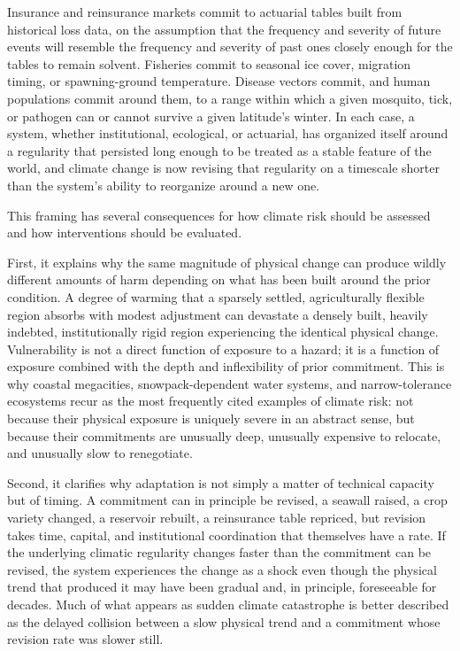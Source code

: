 \documentclass[11pt,oneside]{book}
\begin{document}
Insurance and reinsurance markets commit to actuarial tables built from historical loss data, on the assumption that the frequency and severity of future events will resemble the frequency and severity of past ones closely enough for the tables to remain solvent. Fisheries commit to seasonal ice cover, migration timing, or spawning-ground temperature. Disease vectors commit, and human populations commit around them, to a range within which a given mosquito, tick, or pathogen can or cannot survive a given latitude's winter. In each case, a system, whether institutional, ecological, or actuarial, has organized itself around a regularity that persisted long enough to be treated as a stable feature of the world, and climate change is now revising that regularity on a timescale shorter than the system's ability to reorganize around a new one.

This framing has several consequences for how climate risk should be assessed and how interventions should be evaluated.

First, it explains why the same magnitude of physical change can produce wildly different amounts of harm depending on what has been built around the prior condition. A degree of warming that a sparsely settled, agriculturally flexible region absorbs with modest adjustment can devastate a densely built, heavily indebted, institutionally rigid region experiencing the identical physical change. Vulnerability is not a direct function of exposure to a hazard; it is a function of exposure combined with the depth and inflexibility of prior commitment. This is why coastal megacities, snowpack-dependent water systems, and narrow-tolerance ecosystems recur as the most frequently cited examples of climate risk: not because their physical exposure is uniquely severe in an abstract sense, but because their commitments are unusually deep, unusually expensive to relocate, and unusually slow to renegotiate.

Second, it clarifies why adaptation is not simply a matter of technical capacity but of timing. A commitment can in principle be revised, a seawall raised, a crop variety changed, a reservoir rebuilt, a reinsurance table repriced, but revision takes time, capital, and institutional coordination that themselves have a rate. If the underlying climatic regularity changes faster than the commitment can be revised, the system experiences the change as a shock even though the physical trend that produced it may have been gradual and, in principle, foreseeable for decades. Much of what appears as sudden climate catastrophe is better described as the delayed collision between a slow physical trend and a commitment whose revision rate was slower still.
\end{document}
